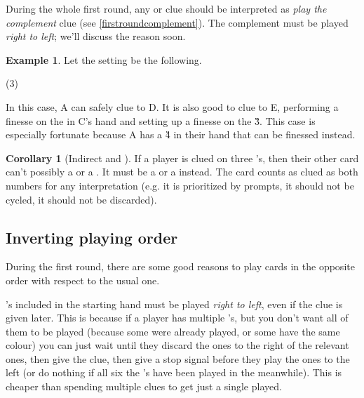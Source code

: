 \documentclass[a4paper]{article}
\theoremstyle{plain}
\theoremstyle{definition}
\newtheorem{corollary}[theorem]{Corollary}
\newtheorem{example}[theorem]{Example}
\begin{document}
During the whole first round, any  or  clue should be interpreted as \textit{play the complement} clue (see \ref{firstroundcomplement}). The complement must be played \textit{right to left}; we'll discuss the reason soon.

\begin{example}
	
	Let the setting be the following.
	
	\begin{tasks}(3)
		\task[+]      
		\task[A]    
		\task[B]    
		\task[C]    
		\task[D]    
		\task[E]    
	\end{tasks}
	
	In this case, A can safely clue  to D. It is also good to clue  to E, performing a finesse on the  in C's hand and setting up a finesse on the \G{3}. This case is especially fortunate because A has a \G{4} in their hand that can be finessed instead.
\end{example}

\begin{corollary}[Indirect  and ]
	\label{indirect25}
	If a player is clued on three 's, then their other card can't possibly a  or a . It must be a  or a  instead. The card counts as clued as both numbers for any interpretation (e.g. it is prioritized by prompts, it should not be cycled, it should not be discarded).
\end{corollary}

\subsection{Inverting playing order}

During the first round, there are some good reasons to play cards in the opposite order with respect to the usual one.

's included in the starting hand must be played \textit{right to left}, even if the clue is given later. This is because if a player has multiple 's, but you don't want all of them to be played (because some were already played, or some have the same colour) you can just wait until they discard the ones to the right of the relevant ones, then give the clue, then give a stop signal before they play the ones to the left (or do nothing if all six the 's have been played in the meanwhile). This is cheaper than spending multiple clues to get just a single  played.
\end{document}

